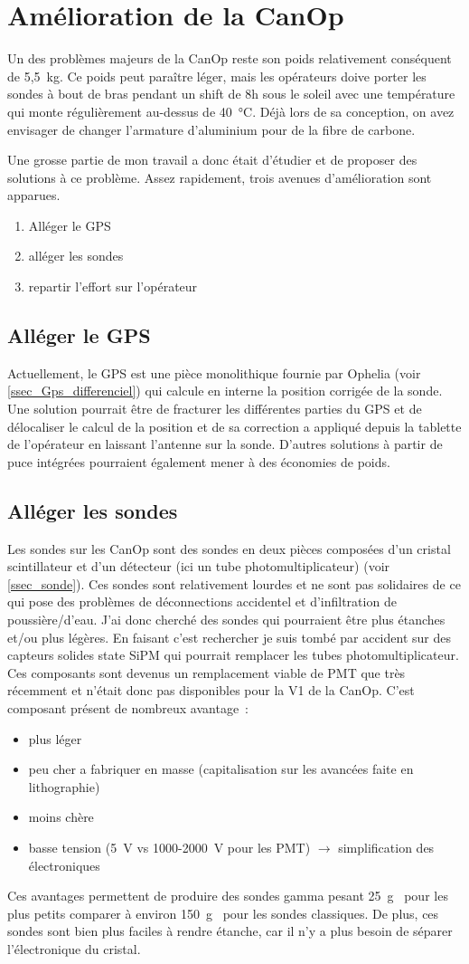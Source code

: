 \section{Amélioration de la CanOp}

Un des problèmes majeurs de la CanOp reste son poids relativement conséquent de 5,5~kg. Ce poids peut paraître léger, mais les opérateurs doive porter les sondes à bout de bras pendant un shift de 8h sous le soleil avec une température qui monte régulièrement au-dessus de 40~°C. Déjà lors de sa conception, on avez envisager de changer l'armature d'aluminium pour de la fibre de carbone. 

Une grosse partie de mon travail a donc était d'étudier et de proposer des solutions à ce problème. Assez rapidement, trois avenues d'amélioration sont apparues.
\begin{enumerate}
    \item Alléger le GPS 
    \item alléger les sondes
    \item repartir l'effort sur l'opérateur
\end{enumerate}

\subsection{Alléger le GPS}
Actuellement, le GPS est une pièce monolithique fournie par Ophelia (voir \cref{ssec_Gps_differenciel}) qui calcule en interne la position corrigée de la sonde. Une solution pourrait être de fracturer les différentes parties du GPS et de délocaliser le calcul de la position et de sa correction a appliqué depuis la tablette de l'opérateur en laissant l'antenne sur la sonde. D'autres solutions à partir de puce intégrées pourraient également mener à des économies de poids.

\subsection{Alléger les sondes}
Les sondes sur les CanOp sont des sondes en deux pièces composées d'un cristal scintillateur et d'un détecteur (ici un tube photomultiplicateur) (voir \cref{ssec_sonde}). Ces sondes sont relativement lourdes et ne sont pas solidaires de ce qui pose des problèmes de déconnections accidentel et d'infiltration de poussière/d'eau. 
J'ai donc cherché des sondes qui pourraient être plus étanches et/ou plus légères. En faisant c'est rechercher je suis tombé par accident sur des capteurs solides state SiPM qui pourrait remplacer les tubes photomultiplicateur. Ces composants sont devenus un remplacement viable de PMT que très récemment et n'était donc pas disponibles pour la V1 de la CanOp. C'est composant présent de nombreux avantage~:
\begin{itemize}
    \item plus léger
    \item peu cher a fabriquer en masse (capitalisation sur les avancées faite en lithographie)
    \item moins chère
    \item basse tension (5~V vs 1000-2000~V pour les PMT) $\rightarrow$ simplification des électroniques
\end{itemize}

Ces avantages permettent de produire des sondes gamma pesant 25~g~\cite{} pour les plus petits comparer à environ 150~g~\cite{} pour les sondes classiques. De plus, ces sondes sont bien plus faciles à rendre étanche, car il n'y a plus besoin de séparer l'électronique du cristal.
